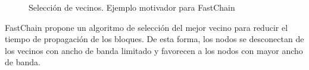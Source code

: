 \begin{figure}
  \centering
  \hspace{1.5cm}
  \caption{Selección de vecinos. Ejemplo motivador para FastChain}
  \label{fig:fastchain}
\end{figure}

%
FastChain propone un algoritmo de selección del mejor vecino para reducir el tiempo de propagación de los bloques.
%
De esta forma, los nodos se desconectan de los vecinos con ancho de banda limitado y
favorecen a los nodos con mayor ancho de banda.
%
%


